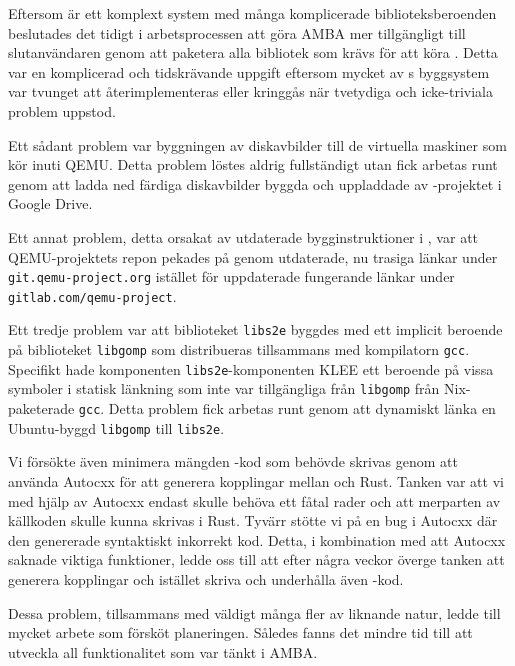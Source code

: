 Eftersom \stoe{} är ett komplext system med många komplicerade
biblioteksberoenden beslutades det tidigt i arbetsprocessen att göra AMBA mer
tillgängligt till slutanvändaren genom att paketera alla bibliotek som krävs för
att köra \stoe{}. Detta var en komplicerad och tidskrävande uppgift eftersom
mycket av \stoe{}s byggsystem var tvunget att återimplementeras eller kringgås
när tvetydiga och icke-triviala problem uppstod.

Ett sådant problem var byggningen av diskavbilder till de virtuella maskiner som
\stoe{} kör inuti QEMU. Detta problem löstes aldrig fullständigt utan fick
arbetas runt genom att ladda ned färdiga diskavbilder byggda och uppladdade av
\stoe{}-projektet i Google Drive.

Ett annat problem, detta orsakat av utdaterade bygginstruktioner i \stoe{}, var
att QEMU-projektets repon pekades på genom utdaterade, nu trasiga länkar under
\texttt{git.qemu-project.org} istället för uppdaterade fungerande länkar under
\\\texttt{gitlab.com/qemu-project}.

Ett tredje problem var att biblioteket \texttt{libs2e} byggdes med ett implicit
beroende på biblioteket \texttt{libgomp} som distribueras tillsammans med
kompilatorn \texttt{gcc}. Specifikt hade komponenten \texttt{libs2e}-komponenten
KLEE ett beroende på vissa symboler i statisk länkning som inte var tillgängliga
från \texttt{libgomp} från Nix-paketerade \texttt{gcc}. Detta problem fick
arbetas runt genom att dynamiskt länka en Ubuntu-byggd \texttt{libgomp} till
\texttt{libs2e}.

Vi försökte även minimera mängden -kod som behövde skrivas genom
att använda Autocxx för att generera kopplingar mellan  och Rust.
Tanken var att vi med hjälp av Autocxx endast skulle behöva ett fåtal rader
 och att merparten av källkoden skulle kunna skrivas i Rust.
Tyvärr stötte vi på en bug i Autocxx där den genererade syntaktiskt inkorrekt
kod. Detta, i kombination med att Autocxx saknade viktiga funktioner, ledde oss
till att efter några veckor överge tanken att generera kopplingar och istället
skriva och underhålla även -kod.

Dessa problem, tillsammans med väldigt många fler av liknande natur, ledde till
mycket arbete som försköt planeringen. Således fanns det mindre tid till att
utveckla all funktionalitet som var tänkt i AMBA.\@
